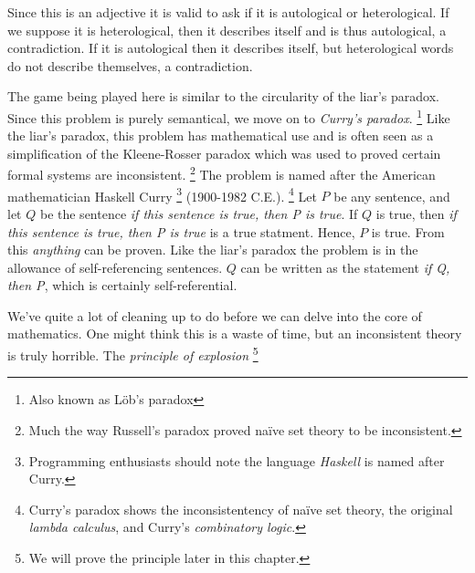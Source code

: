         Since this is an adjective it is valid to ask if it is autological or
        heterological. If we suppose it is heterological, then it describes
        itself and is thus autological, a contradiction. If it is autological
        then it describes itself, but heterological words do not describe
        themselves, a contradiction.
        \par\hfill\par
        The game  being played here is similar to the circularity of the
        liar's paradox. Since this problem is purely semantical, we move on to
        \textit{Curry's paradox}.%
        \footnote{%
            Also known as L\"{o}b's paradox%
        }
        Like the liar's paradox, this problem has mathematical use and is often
        seen as a simplification of the Kleene-Rosser paradox%
         which was
        used to proved certain formal systems are inconsistent.%
        \footnote{%
            Much the way Russell's paradox proved na\"{i}ve set theory to
            be inconsistent.
        }
        The problem is named after the American mathematician
        Haskell Curry%
        \footnote{%
            Programming enthusiasts should note the language
            \textit{Haskell} is named after Curry.
        }
        (1900-1982 C.E.).%
        \footnote{%
            Curry's paradox shows the inconsistentency of na\"{i}ve set theory,
            the original \textit{lambda calculus}, and Curry's
            \textit{combinatory logic}.
        }
        Let $P$ be any sentence, and let $Q$ be the sentence
        \textit{if this sentence is true, then P is true}. If $Q$ is true, then
        \textit{if this sentence is true, then P is true} is a true statment.
        Hence, $P$ is true. From this \textit{anything} can be proven. Like the
        liar's paradox the problem is in the allowance of self-referencing
        sentences. $Q$ can be written as the statement \textit{if Q, then P},
        which is certainly self-referential.
        \par\hfill\par
        We've quite a lot of cleaning up to do before we can delve into the core
        of mathematics. One might think this is a waste of time, but an
        inconsistent theory is truly horrible. The
        \textit{principle of explosion}%
        \footnote{We will prove the principle later in this chapter.}
